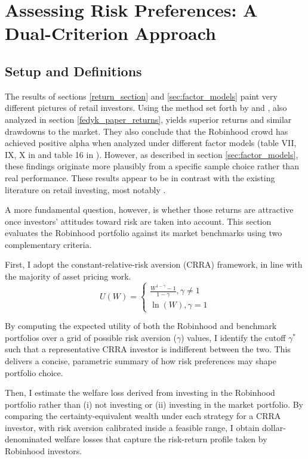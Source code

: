 \section{Assessing Risk Preferences: A Dual-Criterion Approach}
\subsection{Setup and Definitions}
The results of sections \ref{return_section} and \ref{sec:factor_models} paint very different pictures of retail investors. 
Using the method set forth by \cite{Welch2022} and \cite{Fedyk2024}, also analyzed in section \ref{fedyk_paper_returns}, yields superior returns and similar drawdowns to the market.
They also conclude that the Robinhood crowd has achieved positive alpha when analyzed under different factor models (table VII, IX, X in \cite{Welch2022} and table 16 in \cite{Fedyk2024}). 
However, as described in section \ref{sec:factor_models}, these findings originate more plausibly from a specific sample choice rather than real performance.
These results appear to be in contrast with the existing literature on retail investing, most notably \cite{BarberOdean2000}.

A more fundamental question, however, is whether those returns are attractive once investors' attitudes toward risk are taken into account.
This section evaluates the Robinhood portfolio against its market benchmarks using two complementary criteria.

First, I adopt the constant-relative-risk aversion (CRRA) framework, in line with the majority of asset pricing work.
\begin{equation}
    U(W) = 
    \begin{cases}
    \frac{W^{1-\gamma}-1}{1-\gamma}, \gamma\neq 1\\
    \ln(W), \gamma = 1
    \end{cases}
    \label{CRRA}
\end{equation}

By computing the expected utility of both the Robinhood and benchmark portfolios over a grid of possible risk aversion ($\gamma$) values,
I identify the cutoff $\gamma^*$ such that a representative CRRA investor is indifferent between the two.
This delivers a concise, parametric summary of how risk preferences may shape portfolio choice.

Then, I estimate the welfare loss derived from investing in the Robinhood portfolio rather than (i)  not investing or (ii) investing in the market portfolio.
By comparing the certainty-equivalent wealth under each strategy for a CRRA investor, with risk aversion calibrated inside a feasible range,
I obtain dollar-denominated welfare losses that capture the risk-return profile taken by Robinhood investors.

